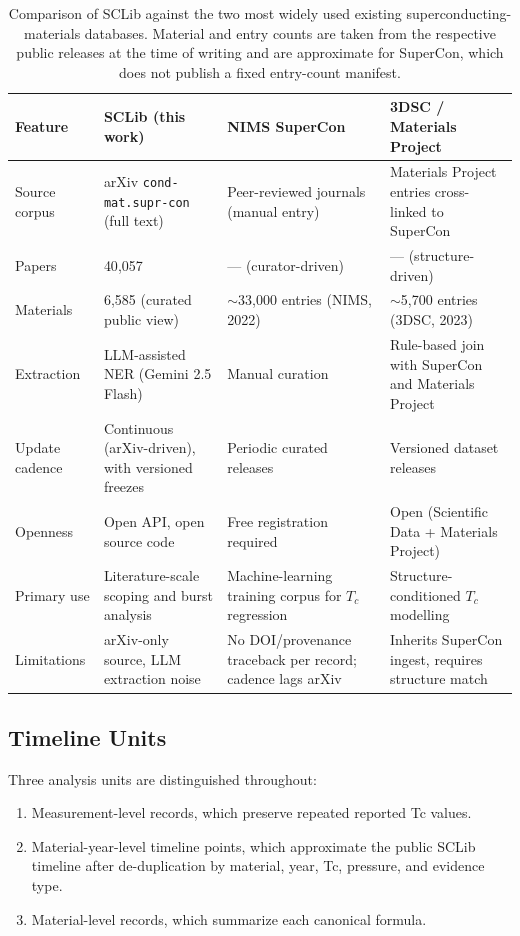 \documentclass[11pt]{article}
\begin{document}
\begin{table}[htbp]
  \centering
  \small
  \begin{tabular}{lp{3.3cm}p{3.3cm}p{3.3cm}}
  \toprule
  Feature & SCLib (this work) & NIMS SuperCon & 3DSC / Materials Project \\
  \midrule
  Source corpus  & arXiv \texttt{cond-mat.supr-con} (full text) & Peer-reviewed journals (manual entry) & Materials Project entries cross-linked to SuperCon \\
  Papers         & 40{,}057 & --- (curator-driven) & --- (structure-driven) \\
  Materials      & 6{,}585 (curated public view) & $\sim$33{,}000 entries (NIMS, 2022) & $\sim$5{,}700 entries (3DSC, 2023) \\
  Extraction     & LLM-assisted NER (Gemini 2.5 Flash) & Manual curation & Rule-based join with SuperCon and Materials Project \\
  Update cadence & Continuous (arXiv-driven), with versioned freezes & Periodic curated releases & Versioned dataset releases \\
  Openness       & Open API, open source code & Free registration required & Open (Scientific Data + Materials Project) \\
  Primary use    & Literature-scale scoping and burst analysis & Machine-learning training corpus for $T_c$ regression & Structure-conditioned $T_c$ modelling \\
  Limitations    & arXiv-only source, LLM extraction noise & No DOI/provenance traceback per record; cadence lags arXiv & Inherits SuperCon ingest, requires structure match \\
  \bottomrule
  \end{tabular}
  \caption{Comparison of SCLib against the two most widely used existing
  superconducting-materials databases. Material and entry counts are taken
  from the respective public releases at the time of writing and are
  approximate for SuperCon, which does not publish a fixed entry-count
  manifest.}
  \label{tab:db-compare}
\end{table}

\subsection{Timeline Units}

Three analysis units are distinguished throughout:

\begin{enumerate}
  \item Measurement-level records, which preserve repeated reported Tc values.
  \item Material-year-level timeline points, which approximate the public SCLib timeline after de-duplication by material, year, Tc, pressure, and evidence type.
  \item Material-level records, which summarize each canonical formula.
\end{enumerate}
\end{document}
